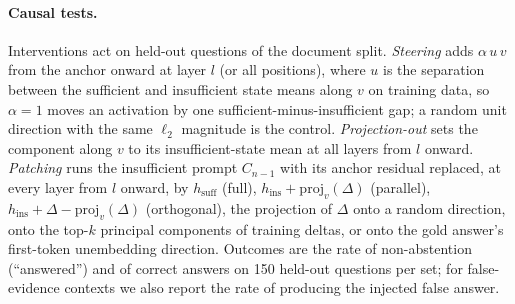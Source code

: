 \paragraph{Causal tests.}
Interventions act on held-out questions of the document split. \emph{Steering} adds $\alpha\,u\,v$ from the anchor onward at layer $l$ (or all positions), where $u$ is the separation between the sufficient and insufficient state means along $v$ on training data, so $\alpha=1$ moves an activation by one sufficient-minus-insufficient gap; a random unit direction with the same $\ell_2$ magnitude is the control. \emph{Projection-out} sets the component along $v$ to its insufficient-state mean at all layers from $l$ onward. \emph{Patching} runs the insufficient prompt $C_{n-1}$ with its anchor residual replaced, at every layer from $l$ onward, by $h_{\text{suff}}$ (full), $h_{\text{ins}}+\mathrm{proj}_v(\Delta)$ (parallel), $h_{\text{ins}}+\Delta-\mathrm{proj}_v(\Delta)$ (orthogonal), the projection of $\Delta$ onto a random direction, onto the top-$k$ principal components of training deltas, or onto the gold answer's first-token unembedding direction. Outcomes are the rate of non-abstention (``answered'') and of correct answers on 150 held-out questions per set; for false-evidence contexts we also report the rate of producing the injected false answer.
